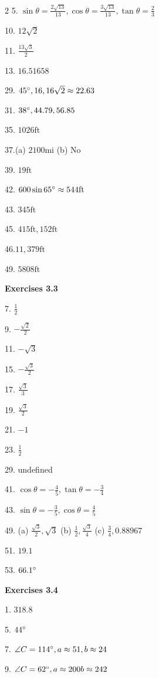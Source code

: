 \begin {multicols}{2}
5. $\sin  \theta  =\frac{2 \sqrt{13}}{13} ,\cos  \theta  =\frac{3 \sqrt{13}}{13} ,\tan  \theta  =\frac{2}{3}$ 

10. $12 \sqrt{2}$ 

11. $\frac{13 \sqrt{3}}{2}$ 

13. $16.51658$ 

29. $45 \mbox{{\ensuremath{{}^\circ}}} ,16 ,16 \sqrt{2} \approx 22.63$ 

31. $38 \mbox{{\ensuremath{{}^\circ}}} ,44.79 ,56.85$ 

35. $1026 \mbox{ft}$ 

37.(a) $2100 \mbox{mi}$ (b) No 

39. $19 \mbox{ft}$ 

42. $600 \sin  65 \mbox{{\ensuremath{{}^\circ}}} \approx 544 \mbox{ft}$ 

43. $345 \mbox{ft}$ 

45. $415 \mbox{ft} ,152 \mbox{ft}$ 

46.$11,379 \mbox{ft}$ 

49. $5808 \mbox{ft}$ 

\textbf{Exercises 3.3} 

7. $\frac{1}{2}$ 

9. $ -\frac{\sqrt{2}}{2}$ 

11. $ -\sqrt{3}$ 

15. $ -\frac{\sqrt{3}}{2}$ 

17. $\frac{\sqrt{3}}{3}$ 

19. $\frac{\sqrt{3}}{2}$ 

21. $ -1$ 

23. $\frac{1}{2}$ 

29. undefined 

41. $\cos  \theta  = -\frac{4}{5} ,\tan  \theta  = -\frac{3}{4}$ 

43. $\sin  \theta  = -\frac{3}{5} ,\cos  \theta  =\frac{4}{5}$ 

49. (a) $\frac{\sqrt{3}}{2} ,\sqrt{3}$ (b) $\frac{1}{2} ,\frac{\sqrt{3}}{4}$ (c) $\frac{3}{4} ,0.88967$ 

51. $19.1$ 

53. $66.1 \mbox{{\ensuremath{{}^\circ}}}$ 

\textbf{Exercises 3.4} 

1. $318.8$ 

5. $44 \mbox{{\ensuremath{{}^\circ}}}$ 

7. $\angle C =114 \mbox{{\ensuremath{{}^\circ}}} ,a \approx 51 ,b \approx 24$ 

9. $\angle C =62 \mbox{{\ensuremath{{}^\circ}}} ,a \approx 200 b \approx 242$ 
\end {multicols}
  

